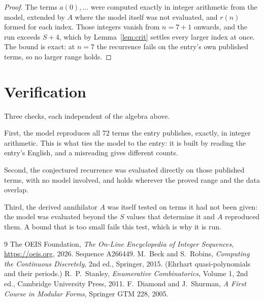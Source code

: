 \documentclass[11pt,a4paper]{article}
\theoremstyle{plain}
\theoremstyle{definition}
\begin{document}
\begin{proof}
The terms $a(0),\dots$ were computed exactly in integer arithmetic from the model, extended by
$A$ where the model itself was not evaluated, and $r(n)$ formed for each index. Those integers
vanish from $n=7+1$ onwards, and the run exceeds $S+4$, which by
Lemma~\ref{lem:crit} settles every larger index at once. The bound is exact: at $n=7$ the recurrence fails on the entry's own published terms, so no larger range holds.
\end{proof}

\section{Verification}

Three checks, each independent of the algebra above.

First, the model reproduces all $72$ terms the entry publishes, exactly, in integer
arithmetic. This is what ties the model to the entry: it is built by reading the entry's
English, and a misreading gives different counts.

Second, the conjectured recurrence was evaluated directly on those published terms, with no
model involved, and holds wherever the proved range and the data overlap.

Third, the derived annihilator $A$ was itself tested on terms it had not been given: the model
was evaluated beyond the $S$ values that determine it and $A$ reproduced them. A bound that is
too small fails this test, which is why it is run.

\begin{thebibliography}{9}
 The OEIS Foundation, \emph{The On-Line Encyclopedia of Integer
Sequences}, \url{https://oeis.org}, 2026. Sequence A266449.
 M.~Beck and S.~Robins, \emph{Computing the Continuous Discretely},
2nd ed., Springer, 2015. (Ehrhart quasi-polynomials and their periods.)
 R.~P.~Stanley, \emph{Enumerative Combinatorics}, Volume 1, 2nd ed.,
Cambridge University Press, 2011.
 F.~Diamond and J.~Shurman, \emph{A First Course in Modular Forms},
Springer GTM 228, 2005.
\end{thebibliography}
\end{document}
